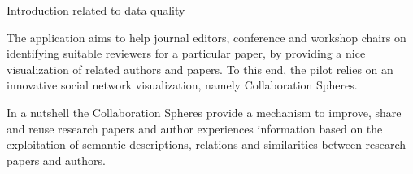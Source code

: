 Introduction related to data quality


The application aims to help journal editors, conference and workshop chairs on identifying suitable reviewers for a particular paper, by providing a nice visualization of related authors and papers. To this end, the pilot relies on an innovative social network visualization, namely Collaboration Spheres. 

In a nutshell the Collaboration Spheres provide a mechanism to improve, share and reuse research papers and author experiences information based on the exploitation of semantic descriptions, relations and similarities between research papers and authors.





